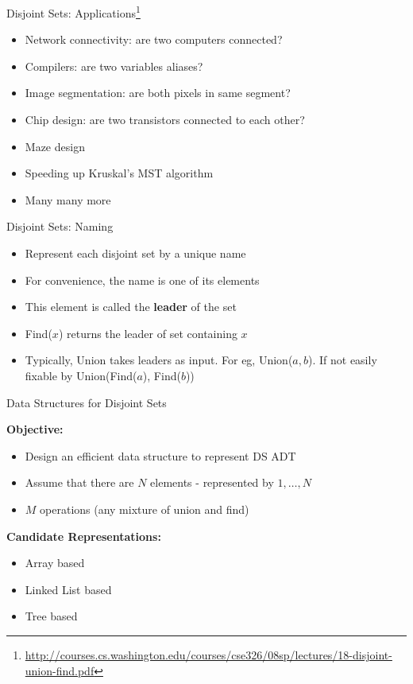 \documentclass{beamer}
\begin{document}
\begin{frame}{Disjoint Sets: Applications\footnote{\url{http://courses.cs.washington.edu/courses/cse326/08sp/lectures/18-disjoint-union-find.pdf}}}
    \begin{itemize}
        \item Network connectivity: are two computers connected? 
        \item Compilers: are two variables aliases?
        \item Image segmentation: are both pixels in same segment?
        \item Chip design: are two transistors connected to each other?
        \item Maze design
        \item Speeding up Kruskal's MST algorithm
        \item Many many more
    \end{itemize}
\end{frame}

\begin{frame}{Disjoint Sets: Naming}
    \begin{itemize}
        \item Represent each disjoint set by a unique name
        \item For convenience, the name is one of its elements
        \item This element is called the {\bf leader} of the set
        \item Find($x$) returns the leader of set containing $x$
        \item Typically, Union takes leaders as input. For eg, Union($a,b$). If not easily fixable by Union(Find($a$), Find($b$)) 
    \end{itemize}
\end{frame}

\begin{frame}{Data Structures for Disjoint Sets}

    {\bf Objective:} 
    \begin{itemize}
        \item Design an efficient data structure to represent DS ADT 
        \item Assume that there are $N$ elements - represented by $1, \ldots, N$
        \item $M$ operations (any mixture of union and find)
    \end{itemize}
    {\bf Candidate Representations:}
    \begin{itemize}
        \item Array based
        \item Linked List based
        \item Tree based
    \end{itemize}
\end{frame}
\end{document}
